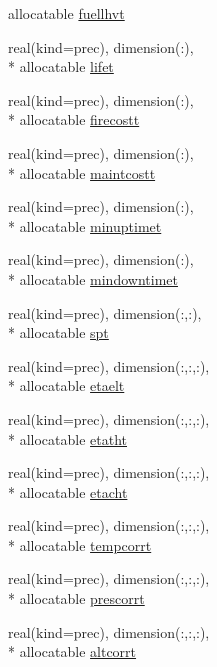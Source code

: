 \begin{DoxyCompactItemize}
allocatable \hyperlink{classinputvar_afe467edd87c4c589d3ad9d5b14825f94}{fuellhvt}
\item 
real(kind=prec), dimension(\-:), \\*
allocatable \hyperlink{classinputvar_a04abed47801bdfcda1ecba21b90ab85b}{lifet}
\item 
real(kind=prec), dimension(\-:), \\*
allocatable \hyperlink{classinputvar_a57526f25accbe0af7902997bd9cde614}{firecostt}
\item 
real(kind=prec), dimension(\-:), \\*
allocatable \hyperlink{classinputvar_abeac95d7e558ca06d4456187b380fdbc}{maintcostt}
\item 
real(kind=prec), dimension(\-:), \\*
allocatable \hyperlink{classinputvar_a90d0b599ed6468fc322cf2fbd6b4ec95}{minuptimet}
\item 
real(kind=prec), dimension(\-:), \\*
allocatable \hyperlink{classinputvar_aca351a4427897a65d991d46243fadc34}{mindowntimet}
\item 
real(kind=prec), dimension(\-:,\-:), \\*
allocatable \hyperlink{classinputvar_aa1da1474767137ee483ef4253b7cef85}{spt}
\item 
real(kind=prec), dimension(\-:,\-:,\-:), \\*
allocatable \hyperlink{classinputvar_af7479b2afabbd7d596d91bb1319b0a8e}{etaelt}
\item 
real(kind=prec), dimension(\-:,\-:,\-:), \\*
allocatable \hyperlink{classinputvar_a93c858e92300ce7dfc06627cbc72d681}{etatht}
\item 
real(kind=prec), dimension(\-:,\-:,\-:), \\*
allocatable \hyperlink{classinputvar_a7cd43a0a5d5ddb8d50af96d4c4f81bea}{etacht}
\item 
real(kind=prec), dimension(\-:,\-:,\-:), \\*
allocatable \hyperlink{classinputvar_a918356589b5f04f76333e6a65de35fb8}{tempcorrt}
\item 
real(kind=prec), dimension(\-:,\-:,\-:), \\*
allocatable \hyperlink{classinputvar_a4dc6d715b00d35dbff920be5c37c1d89}{prescorrt}
\item 
real(kind=prec), dimension(\-:,\-:,\-:), \\*
allocatable \hyperlink{classinputvar_a1405821026cba8a541725451f5a6f8dd}{altcorrt}

\end{DoxyCompactItemize}
